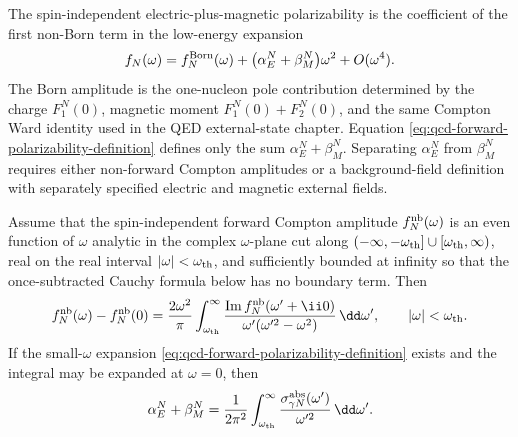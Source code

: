 \begin{definition}
The spin-independent electric-plus-magnetic polarizability is the coefficient
of the first non-Born term in the low-energy expansion
\begin{equation}
  f_N(\omega)
  =
  f_N^{\rm Born}(\omega)
  +
  \bigl(\alpha_E^N+\beta_M^N\bigr)\omega^2
  +O(\omega^4).
  \label{eq:qcd-forward-polarizability-definition}
\end{equation}
The Born amplitude is the one-nucleon pole contribution determined by the
charge \(F_1^N(0)\), magnetic moment \(F_1^N(0)+F_2^N(0)\), and the same
Compton Ward identity used in the QED external-state chapter.  Equation
\eqref{eq:qcd-forward-polarizability-definition} defines only the sum
\(\alpha_E^N+\beta_M^N\).  Separating \(\alpha_E^N\) from \(\beta_M^N\)
requires either non-forward Compton amplitudes or a background-field
definition with separately specified electric and magnetic external fields.
\end{definition}

\begin{proposition}
\label{prop:qcd-baldin-forward-dispersion}
Assume that the spin-independent forward Compton amplitude
\(f_N^{\rm nb}(\omega)\) is an even function of \(\omega\) analytic in the
complex \(\omega\)-plane cut along
\((-\infty,-\omega_{\rm th}]\cup[\omega_{\rm th},\infty)\), real on the
real interval \(|\omega|<\omega_{\rm th}\), and sufficiently bounded at
infinity so that the once-subtracted Cauchy formula below has no boundary
term.  Then
\begin{equation}
  f_N^{\rm nb}(\omega)-f_N^{\rm nb}(0)
  =
  \frac{2\omega^2}{\pi}
  \int_{\omega_{\rm th}}^\infty
  \frac{\operatorname{Im}f_N^{\rm nb}(\omega'+\ii0)}
       {\omega'(\omega'^2-\omega^2)}
  \,\dd\omega',
  \qquad |\omega|<\omega_{\rm th}.
  \label{eq:qcd-forward-compton-subtracted-dispersion}
\end{equation}
If the small-\(\omega\) expansion
\eqref{eq:qcd-forward-polarizability-definition} exists and the integral may
be expanded at \(\omega=0\), then
\begin{equation}
  \alpha_E^N+\beta_M^N
  =
  \frac{1}{2\pi^2}
  \int_{\omega_{\rm th}}^\infty
  \frac{\sigma_{\gamma N}^{\rm abs}(\omega')}{\omega'^2}\,\dd\omega' .
  \label{eq:qcd-baldin-sum-rule}
\end{equation}
\end{proposition}


